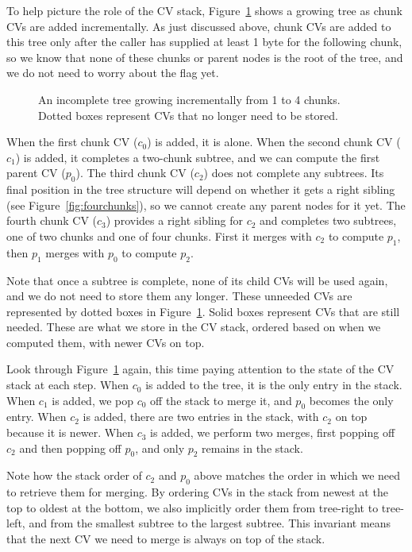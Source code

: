 \documentclass[11pt,notitlepage,a4paper]{article}
\newcommand{\flag}[1]{\texttt{\detokenize{#1}}\xspace}
\begin{document}
To help picture the role of the CV stack, Figure~\ref{fig:incrementaltrees}
shows a growing tree as chunk CVs are added incrementally. As just discussed
above, chunk CVs are added to this tree only after the caller has supplied at
least 1 byte for the following chunk, so we know that none of these chunks or
parent nodes is the root of the tree, and we do not need to worry about the
\flag{ROOT} flag yet.

\begin{figure}[h]
\centering

\caption{An incomplete tree growing incrementally from 1 to 4 chunks. Dotted
    boxes represent CVs that no longer need to be stored.}
\label{fig:incrementaltrees}
\end{figure}

When the first chunk CV ($c_0$) is added, it is alone. When the second chunk CV
($c_1$) is added, it completes a two-chunk subtree, and we can compute the
first parent CV ($p_0$). The third chunk CV ($c_2$) does not complete any
subtrees. Its final position in the tree structure will depend on whether it
gets a right sibling (see Figure~\ref{fig:fourchunks}), so we cannot create any
parent nodes for it yet. The fourth chunk CV ($c_3$) provides a right sibling
for $c_2$ and completes two subtrees, one of two chunks and one of four chunks.
First it merges with $c_2$ to compute $p_1$, then $p_1$ merges with $p_0$ to
compute $p_2$.

Note that once a subtree is complete, none of its child CVs will be used again,
and we do not need to store them any longer. These unneeded CVs are represented
by dotted boxes in Figure~\ref{fig:incrementaltrees}. Solid boxes represent CVs
that are still needed. These are what we store in the CV stack, ordered based
on when we computed them, with newer CVs on top.

Look through Figure~\ref{fig:incrementaltrees} again, this time paying
attention to the state of the CV stack at each step. When $c_0$ is added to the
tree, it is the only entry in the stack. When $c_1$ is added, we pop $c_0$ off
the stack to merge it, and $p_0$ becomes the only entry. When $c_2$ is added,
there are two entries in the stack, with $c_2$ on top because it is newer. When
$c_3$ is added, we perform two merges, first popping off $c_2$ and then popping
off $p_0$, and only $p_2$ remains in the stack.

Note how the stack order of $c_2$ and $p_0$ above matches the order in which we
need to retrieve them for merging. By ordering CVs in the stack from newest at
the top to oldest at the bottom, we also implicitly order them from tree-right
to tree-left, and from the smallest subtree to the largest subtree. This
invariant means that the next CV we need to merge is always on top of the
stack.
\end{document}
